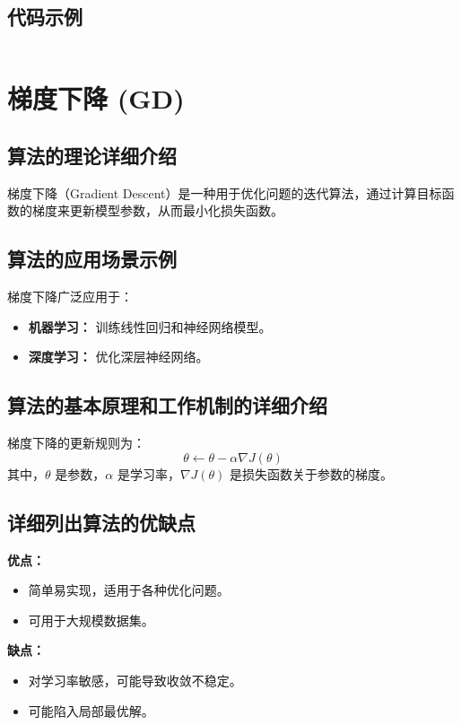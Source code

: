 \subsection*{代码示例}
\begin{lstlisting}

\end{lstlisting}


\section{梯度下降 (GD)}
\subsection*{算法的理论详细介绍}
梯度下降（Gradient Descent）是一种用于优化问题的迭代算法，通过计算目标函数的梯度来更新模型参数，从而最小化损失函数。

\subsection*{算法的应用场景示例}
梯度下降广泛应用于：
\begin{itemize}
    \item \textbf{机器学习：} 训练线性回归和神经网络模型。
    \item \textbf{深度学习：} 优化深层神经网络。
\end{itemize}

\subsection*{算法的基本原理和工作机制的详细介绍}
梯度下降的更新规则为：
\[
    \theta \leftarrow \theta - \alpha \nabla J(\theta)
\]
其中，\(\theta\) 是参数，\(\alpha\) 是学习率，\(\nabla J(\theta)\) 是损失函数关于参数的梯度。

\subsection*{详细列出算法的优缺点}
\textbf{优点：}
\begin{itemize}
    \item 简单易实现，适用于各种优化问题。
    \item 可用于大规模数据集。
\end{itemize}

\textbf{缺点：}
\begin{itemize}
    \item 对学习率敏感，可能导致收敛不稳定。
    \item 可能陷入局部最优解。
\end{itemize}

